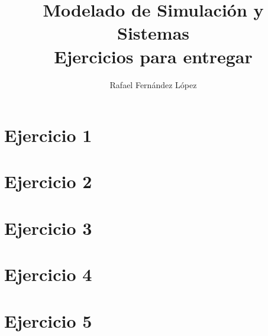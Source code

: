 \documentclass[12pt]{article}
\title{Modelado de Simulación y Sistemas\\Ejercicios para entregar}
\author{Rafael Fernández López}
\date{}
\begin{document}
\maketitle
\newpage
\tableofcontents
\newpage

\section{Ejercicio 1}
\newpage

\section{Ejercicio 2}
\newpage

\section{Ejercicio 3}
\newpage

\section{Ejercicio 4}
\newpage

\section{Ejercicio 5}
\end{document}
